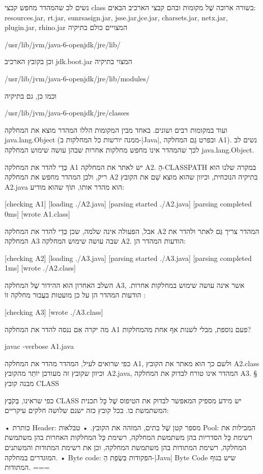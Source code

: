 נשים לב שהמהדר מחפש קבצי class בשורה ארוכה שֶׁל מקומות ובהם קבצי הארכיב הבאים:
resources.jar, rt.jar, sunrsasign.jar, jsse.jar,jce.jar, charsets.jar, netx.jar,
plugin.jar, rhino.jar המצויים כולם בתיקיה

/usr/lib/jvm/java-6-openjdk/jre/lib/

וכן בקובץ הארכיב jdk.boot.jar המצוי בתיקיה

/usr/lib/jvm/java-6-openjdk/jre/lib/modules/

וכמו כן, גם בתיקיה

/usr/lib/jvm/java-6-openjdk/jre/classes

ועוד במקומות רבים ושונים. באחד מבין המקומות הללו המהדר מוצא את המחלקה
java.lang.Object (ממנה יורשות כל המחלקות ב-|Java|, ובפרט גַּם המחלקה
A1). נשים לב לכך שהמהדר אינו מחפש מחלקות אחרות שבהן עושה שימוש המחלקה
java.lang.Object.

כְּדֵי להדר את המחלקה A1 יש לאתר את המחלקה A2. הַ-CLASSPATH
במקרה שלנו הוא ריק, ולכן המהדר מחפש את המחלקה A2 בתיקיה הנוכחית, וכיוון
שהוא מוצא שֵׁם את הקובץ A2.java הוא מהדר אותו, תּוֹךְ שהוא מודיע:

[checking A1]
[loading ./A2.java]
[parsing started ./A2.java]
[parsing completed 0ms]
[wrote A1.class]

אבל, הפעולה אינה שלמה, שכן כְּדֵי להדר את המחלקה A2 המהדר צריך גַּם
לאתר ולהדר את המחלקה A3 שבה עושה שימוש המחלקה A2. הודעות המהדר הן:

[checking A2]
[loading ./A3.java]
[parsing started ./A3.java]
[parsing completed 1ms]
[wrote ./A2.class]

השלב האחרון הוא ההידור שֶׁל המחלקה A3, אשר אינה עושה שימוש במחלקות
אחרות. הודעות המהדר הן על כן מועטות בעֲבוּר מחלקה זוֹ :

[checking A3]
[wrote ./A3.class]

מה יקרה אִם ננסה להדר את המחלקה A1 פעם נוספת, מבלי לשנות אף אחת
מהמחלקות?

javac -verbose A1.java
\END

כפי שרואים לעיל, המהדר מהדר את המחלקה A1, ולשם כך הוא מאתר את הקובץ
A2.class וכיוון שקובץ זה מעודכן יוֹתֵר מהקובץ A2.java, המהדר אינו טורח לבדוק את
המחלקה A3.
§ מבנה קובץ CLASS

כפי שראינו, בְּקֹבֶץ CLASS יש מידע מספיק המאפשר לבדוק את הטיפוס שֶׁל כָּל
תכנית המשתמשת בו. בכל קובץ כזה ישנם שלושה חלקים עיקריים:

• כותרת Header: מספר קטן שֶׁל בתים, המזהה את הקובץ.
• טבלאות Pool: המכילות את רשימת כָּל הסדריות בהן משתמשת המחלקה, רשימת
כָּל המחלקות האחרות בהן משתמשת המחלקה, רשימת המתודות בהן משתמשת
המחלקה, וכן את רשימת המתודות והמשתנים המוגדרים במחלקה.
• Byte code: הפקודות בִּשְׂפַת הַ-|Java| Byte Code שיש בגוף המתודות.
===

